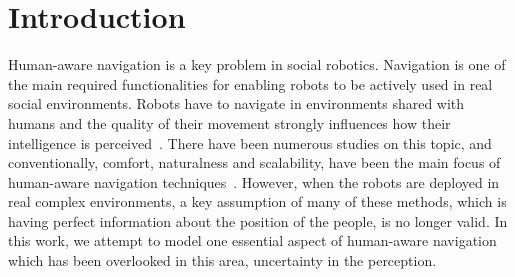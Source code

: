 \section{Introduction}


Human-aware navigation is a key problem in social robotics. Navigation is one of the main required functionalities for enabling robots to be actively used in real social environments. %
Robots have to navigate in environments shared with humans and the quality of their movement strongly influences how their intelligence is perceived~\cite{Althaus2004}. There have been numerous studies on this topic, and conventionally, comfort, naturalness and scalability, have been the main focus of human-aware navigation techniques~\cite{Kruse2013}. However, when the robots are deployed in real complex environments, a key assumption of many of these methods, which is having perfect information about the position of the people, is no longer valid. In this work, we attempt to model one essential aspect of human-aware navigation which has been overlooked in this area, uncertainty in the perception.


